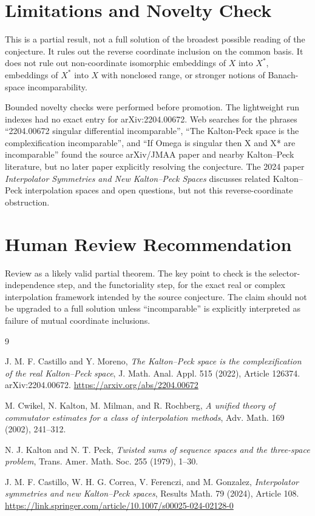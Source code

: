 \documentclass[11pt]{amsart}
\theoremstyle{remark}
\begin{document}
\section{Limitations and Novelty Check}

This is a partial result, not a full solution of the broadest possible reading
of the conjecture.  It rules out the reverse coordinate inclusion on the common
basis.  It does not rule out non-coordinate isomorphic embeddings of $X$ into
$X^*$, embeddings of $X^*$ into $X$ with nonclosed range, or stronger notions of
Banach-space incomparability.

Bounded novelty checks were performed before promotion.  The lightweight run
indexes had no exact entry for arXiv:2204.00672.  Web searches for the phrases
``2204.00672 singular differential incomparable'', ``The Kalton-Peck space is
the complexification incomparable'', and ``If Omega is singular then X and X*
are incomparable'' found the source arXiv/JMAA paper and nearby Kalton--Peck
literature, but no later paper explicitly resolving the conjecture.  The 2024
paper \emph{Interpolator Symmetries and New Kalton--Peck Spaces} discusses
related Kalton--Peck interpolation spaces and open questions, but not this
reverse-coordinate obstruction.

\section{Human Review Recommendation}

Review as a likely valid partial theorem.  The key point to check is the
selector-independence step, and the functoriality step, for the exact real or
complex interpolation framework intended by the source conjecture.  The claim
should not be upgraded to a full solution unless ``incomparable'' is explicitly
interpreted as failure of mutual coordinate inclusions.

\begin{thebibliography}{9}

J. M. F. Castillo and Y. Moreno,
\emph{The Kalton--Peck space is the complexification of the real Kalton--Peck
space},
J. Math. Anal. Appl. 515 (2022), Article 126374.
arXiv:2204.00672.
\url{https://arxiv.org/abs/2204.00672}

M. Cwikel, N. Kalton, M. Milman, and R. Rochberg,
\emph{A unified theory of commutator estimates for a class of interpolation
methods},
Adv. Math. 169 (2002), 241--312.

N. J. Kalton and N. T. Peck,
\emph{Twisted sums of sequence spaces and the three-space problem},
Trans. Amer. Math. Soc. 255 (1979), 1--30.

J. M. F. Castillo, W. H. G. Correa, V. Ferenczi, and M. Gonzalez,
\emph{Interpolator symmetries and new Kalton--Peck spaces},
Results Math. 79 (2024), Article 108.
\url{https://link.springer.com/article/10.1007/s00025-024-02128-0}

\end{thebibliography}
\end{document}
